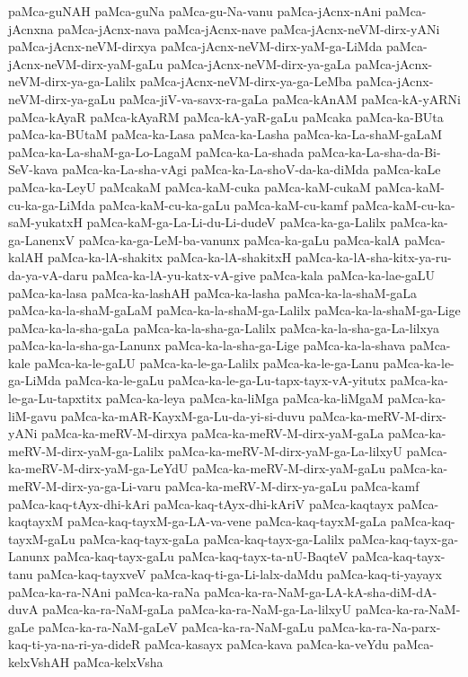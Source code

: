{paMca-guNAH
paMca-guNa
paMca-gu-Na-vanu
paMca-jAcnx-nAni
paMca-jAcnxna
paMca-jAcnx-nava
paMca-jAcnx-nave
paMca-jAcnx-neVM-dirx-yANi
paMca-jAcnx-neVM-dirxya
paMca-jAcnx-neVM-dirx-yaM-ga-LiMda
paMca-jAcnx-neVM-dirx-yaM-gaLu
paMca-jAcnx-neVM-dirx-ya-gaLa
paMca-jAcnx-neVM-dirx-ya-ga-Lalilx
paMca-jAcnx-neVM-dirx-ya-ga-LeMba
paMca-jAcnx-neVM-dirx-ya-gaLu
paMca-jiV-va-savx-ra-gaLa
paMca-kAnAM
paMca-kA-yARNi
paMca-kAyaR
paMca-kAyaRM
paMca-kA-yaR-gaLu
paMcaka
paMca-ka-BUta
paMca-ka-BUtaM
paMca-ka-Lasa
paMca-ka-Lasha
paMca-ka-La-shaM-gaLaM
paMca-ka-La-shaM-ga-Lo-LagaM
paMca-ka-La-shada
paMca-ka-La-sha-da-Bi-SeV-kava
paMca-ka-La-sha-vAgi
paMca-ka-La-shoV-da-ka-diMda
paMca-kaLe
paMca-ka-LeyU
paMcakaM
paMca-kaM-cuka
paMca-kaM-cukaM
paMca-kaM-cu-ka-ga-LiMda
paMca-kaM-cu-ka-gaLu
paMca-kaM-cu-kamf
paMca-kaM-cu-ka-saM-yukatxH
paMca-kaM-ga-La-Li-du-Li-dudeV
paMca-ka-ga-Lalilx
paMca-ka-ga-LanenxV
paMca-ka-ga-LeM-ba-vanunx
paMca-ka-gaLu
paMca-kalA
paMca-kalAH
paMca-ka-lA-shakitx
paMca-ka-lA-shakitxH
paMca-ka-lA-sha-kitx-ya-ru-da-ya-vA-daru
paMca-ka-lA-yu-katx-vA-give
paMca-kala
paMca-ka-lae-gaLU
paMca-ka-lasa
paMca-ka-lashAH
paMca-ka-lasha
paMca-ka-la-shaM-gaLa
paMca-ka-la-shaM-gaLaM
paMca-ka-la-shaM-ga-Lalilx
paMca-ka-la-shaM-ga-Lige
paMca-ka-la-sha-gaLa
paMca-ka-la-sha-ga-Lalilx
paMca-ka-la-sha-ga-La-lilxya
paMca-ka-la-sha-ga-Lanunx
paMca-ka-la-sha-ga-Lige
paMca-ka-la-shava
paMca-kale
paMca-ka-le-gaLU
paMca-ka-le-ga-Lalilx
paMca-ka-le-ga-Lanu
paMca-ka-le-ga-LiMda
paMca-ka-le-gaLu
paMca-ka-le-ga-Lu-tapx-tayx-vA-yitutx
paMca-ka-le-ga-Lu-tapxtitx
paMca-ka-leya
paMca-ka-liMga
paMca-ka-liMgaM
paMca-ka-liM-gavu
paMca-ka-mAR-KayxM-ga-Lu-da-yi-si-duvu
paMca-ka-meRV-M-dirx-yANi
paMca-ka-meRV-M-dirxya
paMca-ka-meRV-M-dirx-yaM-gaLa
paMca-ka-meRV-M-dirx-yaM-ga-Lalilx
paMca-ka-meRV-M-dirx-yaM-ga-La-lilxyU
paMca-ka-meRV-M-dirx-yaM-ga-LeYdU
paMca-ka-meRV-M-dirx-yaM-gaLu
paMca-ka-meRV-M-dirx-ya-ga-Li-varu
paMca-ka-meRV-M-dirx-ya-gaLu
paMca-kamf
paMca-kaq-tAyx-dhi-kAri
paMca-kaq-tAyx-dhi-kAriV
paMca-kaqtayx
paMca-kaqtayxM
paMca-kaq-tayxM-ga-LA-va-vene
paMca-kaq-tayxM-gaLa
paMca-kaq-tayxM-gaLu
paMca-kaq-tayx-gaLa
paMca-kaq-tayx-ga-Lalilx
paMca-kaq-tayx-ga-Lanunx
paMca-kaq-tayx-gaLu
paMca-kaq-tayx-ta-nU-BaqteV
paMca-kaq-tayx-tanu
paMca-kaq-tayxveV
paMca-kaq-ti-ga-Li-lalx-daMdu
paMca-kaq-ti-yayayx
paMca-ka-ra-NAni
paMca-ka-raNa
paMca-ka-ra-NaM-ga-LA-kA-sha-diM-dA-duvA
paMca-ka-ra-NaM-gaLa
paMca-ka-ra-NaM-ga-La-lilxyU
paMca-ka-ra-NaM-gaLe
paMca-ka-ra-NaM-gaLeV
paMca-ka-ra-NaM-gaLu
paMca-ka-ra-Na-parx-kaq-ti-ya-na-ri-ya-dideR
paMca-kasayx
paMca-kava
paMca-ka-veYdu
paMca-kelxVshAH
paMca-kelxVsha
}
